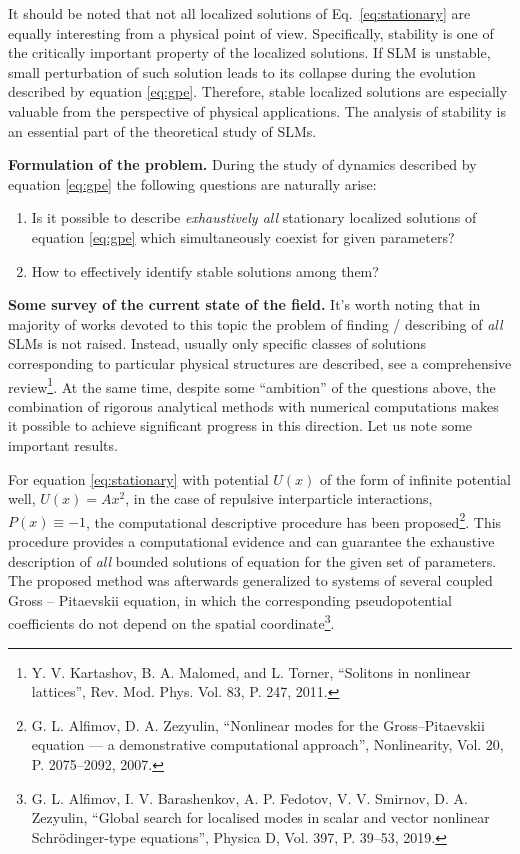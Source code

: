 \documentclass[candidate, href, colorlinks]{disser}
\begin{document}
It should be noted that not all localized solutions of Eq.~\eqref{eq:stationary} are equally interesting from a physical point of view.
Specifically, stability is one of the critically important property of the localized solutions.
If SLM is unstable, small perturbation of such solution leads to its collapse during the evolution described by equation \eqref{eq:gpe}.
Therefore, stable localized solutions are especially valuable from the perspective of physical applications.
The analysis of stability is an essential part of the theoretical study of SLMs.

\textbf{Formulation of the problem.}
During the study of dynamics described by equation \eqref{eq:gpe} the following questions are naturally arise:
\begin{enumerate}
	\item Is it possible to describe {\it exhaustively all} stationary localized solutions of equation \eqref{eq:gpe} which simultaneously coexist for given parameters?
	\item How to effectively identify stable solutions among them?
\end{enumerate}

\textbf{Some survey of the current state of the field.}
It's worth noting that in majority of works devoted to this topic the problem of finding / describing of {\it all} SLMs is not raised.
Instead, usually only specific classes of solutions corresponding to particular physical structures are described, see a comprehensive review\footnote{Y. V. Kartashov, B. A. Malomed, and L. Torner, ``Solitons in nonlinear lattices'', Rev. Mod. Phys. Vol. 83, P. 247, 2011.}.
At the same time, despite some ``ambition'' of the questions above, the combination of rigorous analytical methods with numerical computations makes it possible to achieve significant progress in this direction.
Let us note some important results.

For equation \eqref{eq:stationary} with potential $U(x)$ of the form of infinite potential well, $U(x) = A x^2$, in the case of repulsive interparticle interactions, $P(x) \equiv -1$, the computational descriptive procedure has been proposed\footnote{\label{note:alfzez} G. L. Alfimov, D. A. Zezyulin, ``Nonlinear modes for the Gross--Pitaevskii equation --- a demonstrative computational approach'', Nonlinearity, Vol. 20, P. 2075--2092, 2007.}.
This procedure provides a computational evidence and can guarantee the exhaustive description of {\it all} bounded solutions of equation for the given set of parameters.
The proposed method was afterwards generalized to systems of several coupled Gross -- Pitaevskii equation, in which the corresponding pseudopotential coefficients do not depend on the spatial coordinate\footnote{G. L. Alfimov, I. V. Barashenkov, A. P. Fedotov, V. V. Smirnov, D. A. Zezyulin, ``Global search for localised modes in scalar and vector nonlinear Schr{\"o}dinger-type equations'', Physica D, Vol. 397, P. 39--53, 2019.}.
\end{document}
